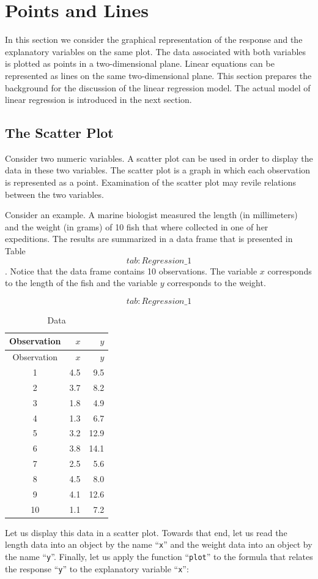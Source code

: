 \documentclass[
]{krantz}
\theoremstyle{definition}
\theoremstyle{definition}
\theoremstyle{definition}
\theoremstyle{remark}
\begin{document}
\hypertarget{points-and-lines}{%
\section{Points and Lines}\label{points-and-lines}}

In this section we consider the graphical representation of the response
and the explanatory variables on the same plot. The data associated with
both variables is plotted as points in a two-dimensional plane. Linear
equations can be represented as lines on the same two-dimensional plane.
This section prepares the background for the discussion of the linear
regression model. The actual model of linear regression is introduced in
the next section.

\hypertarget{the-scatter-plot}{%
\subsection{The Scatter Plot}\label{the-scatter-plot}}

Consider two numeric variables. A scatter plot can be used in order to
display the data in these two variables. The scatter plot is a graph in
which each observation is represented as a point. Examination of the
scatter plot may revile relations between the two variables.

Consider an example. A marine biologist measured the length (in
millimeters) and the weight (in grams) of 10 fish that where collected
in one of her expeditions. The results are summarized in a data frame
that is presented in Table~\[tab:Regression\_1\]. Notice that the data
frame contains 10 observations. The variable \(x\) corresponds to the
length of the fish and the variable \(y\) corresponds to the weight.

\[tab:Regression\_1\]

\begin{longtable}[]{@{}crr@{}}
\caption{Data}\tabularnewline
\toprule
Observation & \(x\) & \(y\)\tabularnewline
\midrule
\endfirsthead
\toprule
Observation & \(x\) & \(y\)\tabularnewline
\midrule
\endhead
1 & 4.5 & 9.5\tabularnewline
2 & 3.7 & 8.2\tabularnewline
3 & 1.8 & 4.9\tabularnewline
4 & 1.3 & 6.7\tabularnewline
5 & 3.2 & 12.9\tabularnewline
6 & 3.8 & 14.1\tabularnewline
7 & 2.5 & 5.6\tabularnewline
8 & 4.5 & 8.0\tabularnewline
9 & 4.1 & 12.6\tabularnewline
10 & 1.1 & 7.2\tabularnewline
\bottomrule
\end{longtable}

Let us display this data in a scatter plot. Towards that end, let us
read the length data into an object by the name ``\texttt{x}'' and the weight
data into an object by the name ``\texttt{y}''. Finally, let us apply the
function ``\texttt{plot}'' to the formula that relates the response ``\texttt{y}'' to the
explanatory variable ``\texttt{x}'':
\end{document}
